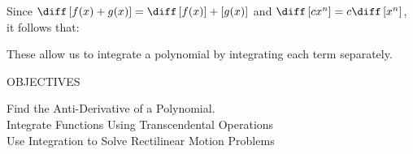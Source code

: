 \begin{center}  
\end{center}

Since $\diff \left[f(x) + g(x)\right] = \diff \left[f(x)\right] + \left[g(x)\right]$ and $\diff \left[cx^n\right] = c\diff \left[x^n\right]$, it follows that: 
\begin{center}  
\end{center}

These allow us to integrate a polynomial by integrating each term separately. \par

\begin{tcolorbox}[objective]
    \begin{center}
        OBJECTIVES \\[11pt]
    \end{center}
    Find the Anti-Derivative of a Polynomial. \\
    Integrate Functions Using Transcendental Operations \\
    Use Integration to Solve Rectilinear Motion Problems 
\end{tcolorbox} \vspace{11pt}

